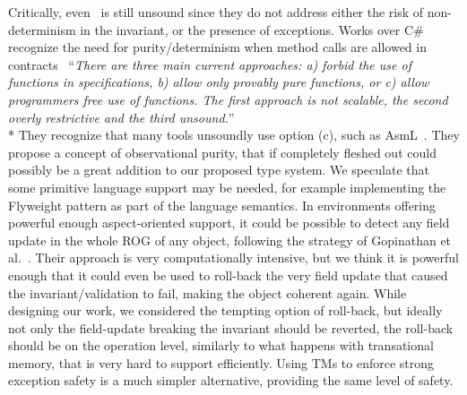 Critically, even~\cite{Gopinathan:2008:RMO:1483018.1483028} is still unsound since they do not address either
the risk of non-determinism in the invariant, 
or the presence of exceptions.
\sepItems
Works over C\# recognize the need
for purity/determinism when method calls are allowed in contracts~\cite{barnett200499}
``\emph{There are three main current approaches: a) forbid the use of functions in specifications, b) allow only provably pure functions, or c) allow programmers free use
of functions. The first approach is not scalable, the second overly restrictive and
the third unsound.}''\\*
They recognize that many tools unsoundly use option (c), such as AsmL~\cite{barnett2003runtime}.
They propose a concept of observational purity, that if completely fleshed out
could possibly be a great addition to our proposed type system.
We speculate that some 
primitive language support may be needed, for example implementing the Flyweight pattern 
as part of the language semantics.
\sepItems
In environments offering powerful enough aspect-oriented support,
it could be possible to detect any field update in the whole ROG of
any object, following the strategy of 
Gopinathan et al.~\cite{Gopinathan:2008:RMO:1483018.1483028}.
Their approach is very computationally intensive, but we think it is powerful enough that it could even be used to roll-back the very field update that caused 
the invariant/validation to fail, making the object coherent again.
While designing our work, we considered the tempting option of roll-back, but
ideally not only the field-update breaking the invariant should be reverted,
the roll-back should be on the operation level, similarly to what happens
with transational memory, that is very hard to support efficiently.
Using TMs to enforce strong exception safety is
a much simpler alternative, providing the same level of safety.





